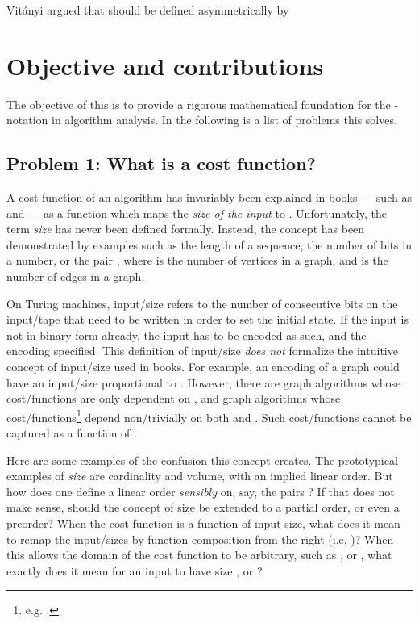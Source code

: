 \documentclass[b5paper, english, oneside]{memoir}
\begin{document}
Vit\'anyi \cite{BigOmegaVsWild} argued that  should be defined asymmetrically by


\section{Objective and contributions}

The objective of this \manuscript{} is to provide a rigorous mathematical foundation for the -notation in algorithm analysis. In the following is a list of problems this \manuscript{} solves. 

\subsection{Problem 1: What is a cost function?}

A cost function of an algorithm has invariably been explained in books --- such as \cite{DesignAndAnalysisOfComputerAlgorithms} and \cite{IntroAlgo2009} --- as a function which maps the \emph{size of the input} to . Unfortunately, the term \emph{size} has never been defined formally. Instead, the concept has been demonstrated by examples such as the length of a sequence, the number of bits in a number, or the pair , where  is the number of vertices in a graph, and  is the number of edges in a graph. 

On Turing machines, input\-/size refers to the number of consecutive bits on the input\-/tape that need to be written in order to set the initial state. If the input is not in binary form already, the input has to be encoded as such, and the encoding specified. This definition of input\-/size \emph{does not} formalize the intuitive concept of input\-/size used in books. For example, an encoding of a graph could have an input\-/size proportional to . However, there are graph algorithms whose cost\-/functions are only dependent on , and graph algorithms whose cost\-/functions\footnote{e.g. .} depend non\-/trivially on both  and . Such cost\-/functions cannot be captured as a function of .

Here are some examples of the confusion this concept creates. The prototypical examples of \emph{size} are cardinality and volume, with an implied linear order. But how does one define a linear order \emph{sensibly} on, say, the pairs ? If that does not make sense, should the concept of size be extended to a partial order, or even a preorder? When the cost function is a function of input size, what does it mean to remap the input\-/sizes by function composition from the right (i.e. )? When this \manuscript{} allows the domain of the cost function to be arbitrary, such as ,  or , what exactly does it mean for an input to have size ,  or ?
\end{document}
